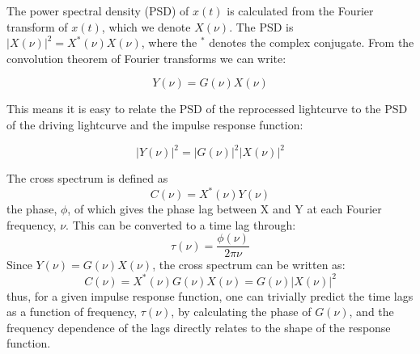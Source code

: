 \documentclass[11pt,letterpaper,fleqn]{article}
\begin{document}
The power spectral density (PSD) of $x(t)$ is calculated from the Fourier transform of $x(t)$, which we denote $X(\nu)$.  The PSD is $|X(\nu)|^2 = X^*(\nu)X(\nu)$, where the $^*$ denotes the complex conjugate.  From the convolution theorem of Fourier transforms we can write:

\begin{equation}
Y(\nu) = G(\nu) X(\nu)
\end{equation}

This means it is easy to relate the PSD of the reprocessed lightcurve to the PSD of the driving lightcurve and the impulse response function:

\begin{equation}
|Y(\nu)|^2 = |G(\nu)|^2 |X(\nu)|^2
\end{equation}

The cross spectrum is defined as
\begin{equation}
C(\nu) = X^*(\nu) Y(\nu)
\end{equation}
the phase, $\phi$, of which gives the phase lag between X and Y at each Fourier frequency, $\nu$.  This can be converted to a time lag through: 
\begin{equation}
\tau(\nu) = \frac{\phi(\nu)}{2\pi\nu}
\end{equation}
Since $Y(\nu) = G(\nu) X(\nu)$,  the cross spectrum can be written as:
\begin{equation}
C(\nu) = X^*(\nu) G(\nu) X(\nu) =  G(\nu) |X(\nu)|^2 
\end{equation}
thus, for a given impulse response function, one can trivially predict the time lags as a function of frequency, $\tau(\nu)$, by calculating the phase of $G(\nu)$, and the frequency dependence of the lags directly relates to the shape of the response function.
\end{document}
